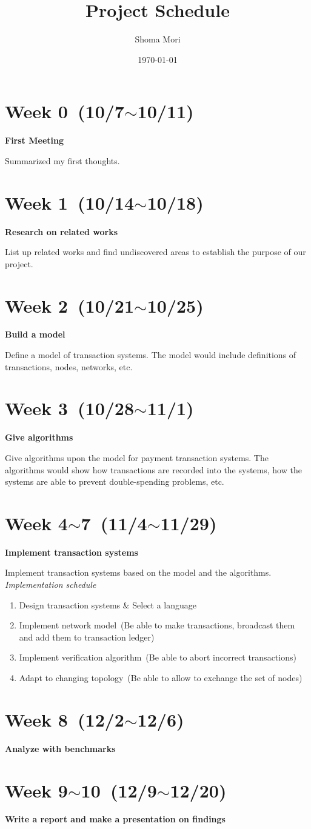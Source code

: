\documentclass[a4j,11pt,uplatex,onecolumn]{article}
\title{Project Schedule}
\author{Shoma Mori}
\date{\today}
\begin{document}
\maketitle

\section{Week 0~(10/7$\sim$10/11)}
\textbf{First Meeting}

Summarized my first thoughts.

\section{Week 1~(10/14$\sim$10/18)}
\textbf{Research on related works}

List up related works and find undiscovered areas to establish the purpose of our project.

\section{Week 2~(10/21$\sim$10/25)}
\textbf{Build a model}

Define a model of transaction systems.
The model would include definitions of transactions, nodes, networks, etc.

\section{Week 3~(10/28$\sim$11/1)}
\textbf{Give algorithms}

Give algorithms upon the model for payment transaction systems.
The algorithms would show how transactions are recorded into the systems, how the systems are able to prevent double-spending problems, etc.

\section{Week 4$\sim$7~(11/4$\sim$11/29)}
\textbf{Implement transaction systems}

Implement transaction systems based on the model and the algorithms.\\

\noindent
\emph{Implementation schedule}
\begin{enumerate}
    \item Design transaction systems \& Select a language
    \item Implement network model~(Be able to make transactions, broadcast them and add them to transaction ledger)
    \item Implement verification algorithm~(Be able to abort incorrect transactions)
    \item Adapt to changing topology~(Be able to allow to exchange the set of nodes)
\end{enumerate}

\section{Week 8~(12/2$\sim$12/6)}
\textbf{Analyze with benchmarks}

\section{Week 9$\sim$10~(12/9$\sim$12/20)}
\textbf{Write a report and make a presentation on findings}
\end{document}
